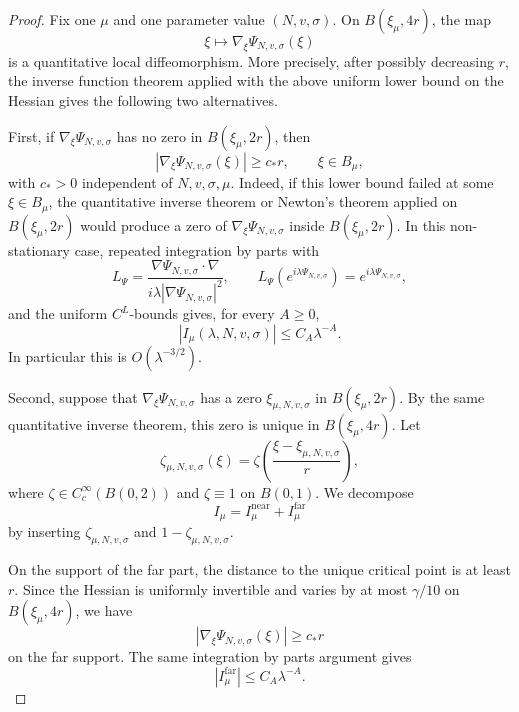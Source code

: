 \documentclass[10pt,a4paper]{amsart}
\begin{document}
\begin{proof}
Fix one \(\mu\) and one parameter value \((N,v,\sigma)\). On
\(B(\xi_\mu,4r)\), the map
\[
        \xi\mapsto \nabla_\xi\Psi_{N,v,\sigma}(\xi)
\]
is a quantitative local diffeomorphism. More precisely, after possibly
decreasing \(r\), the inverse function theorem applied with the above
uniform lower bound on the Hessian gives the following two alternatives.

First, if \(\nabla_\xi\Psi_{N,v,\sigma}\) has no zero in
\(B(\xi_\mu,2r)\), then
\[
       |\nabla_\xi\Psi_{N,v,\sigma}(\xi)|\ge c_* r,
       \qquad \xi\in B_\mu ,
\]
with \(c_*>0\) independent of \(N,v,\sigma,\mu\). Indeed, if this lower
bound failed at some \(\xi\in B_\mu\), the quantitative inverse theorem
or Newton's theorem applied on \(B(\xi_\mu,2r)\) would produce a zero of
\(\nabla_\xi\Psi_{N,v,\sigma}\) inside \(B(\xi_\mu,2r)\). In this
non-stationary case, repeated integration by parts with
\[
       L_{\Psi}
       =
       \frac{\nabla\Psi_{N,v,\sigma}\cdot\nabla}
            {i\lambda|\nabla\Psi_{N,v,\sigma}|^2},
       \qquad
       L_{\Psi}(e^{i\lambda\Psi_{N,v,\sigma}})
       =
       e^{i\lambda\Psi_{N,v,\sigma}},
\]
and the uniform \(C^L\)-bounds gives, for every \(A\ge0\),
\[
       |I_\mu(\lambda,N,v,\sigma)|\le C_A \lambda^{-A}.
\]
In particular this is \(O(\lambda^{-3/2})\).

Second, suppose that \(\nabla_\xi\Psi_{N,v,\sigma}\) has a zero
\(\xi_{\mu,N,v,\sigma}\) in \(B(\xi_\mu,2r)\). By the same quantitative
inverse theorem, this zero is unique in \(B(\xi_\mu,4r)\). Let
\[
      \zeta_{\mu,N,v,\sigma}(\xi)
      =
      \zeta\!\left(\frac{\xi-\xi_{\mu,N,v,\sigma}}{r}\right),
\]
where \(\zeta\in C_c^\infty(B(0,2))\) and \(\zeta\equiv1\) on \(B(0,1)\).
We decompose
\[
       I_\mu=I_{\mu}^{\mathrm{near}}+I_{\mu}^{\mathrm{far}}
\]
by inserting \(\zeta_{\mu,N,v,\sigma}\) and
\(1-\zeta_{\mu,N,v,\sigma}\).

On the support of the far part, the distance to the unique critical point
is at least \(r\). Since the Hessian is uniformly invertible and varies
by at most \(\gamma/10\) on \(B(\xi_\mu,4r)\), we have
\[
       |\nabla_\xi\Psi_{N,v,\sigma}(\xi)|\ge c_* r
\]
on the far support. The same integration by parts argument gives
\[
       |I_{\mu}^{\mathrm{far}}|\le C_A\lambda^{-A}.
\]


\end{proof}
\end{document}
